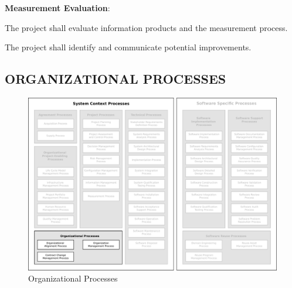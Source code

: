 \begin{adjustwidth}{2em}{0pt}
\begin{compactenum}
\begin{compactenum}
					\end{compactenum}

					\item {\bf Measurement Evaluation}:

					\begin{compactenum}

						\item The project shall evaluate information products and the measurement process.

						\item The project shall identify and communicate potential improvements.

					\end{compactenum}

				\end{compactenum}

			\end{adjustwidth}


	\newpage 
	\subsection{ORGANIZATIONAL PROCESSES\label{subsec:organizational_processes}}

		\begin{figure}[h]
			\centering
			\includegraphics[width=15cm,keepaspectratio]{figures/life-cycle-process-groups-organizational-processes.pdf}
			\caption{Organizational Processes}
			\label{fig:organizational_processes}
		\end{figure}

